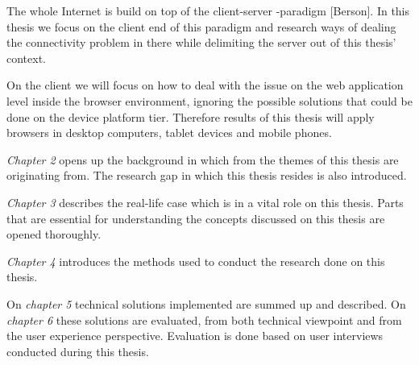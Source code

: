 The whole Internet is build on top of the client-server -paradigm [Berson]. In this thesis we focus on the client end of this paradigm and research ways of dealing the connectivity problem in there while delimiting the server out of this thesis' context. 

On the client we will focus on how to deal with the issue on the web application level inside the browser environment, ignoring the possible solutions that could be done on the device platform tier. Therefore results of this thesis will apply browsers in desktop computers, tablet devices and mobile phones.






\textit{Chapter 2} opens up the background in which from the themes of this thesis are originating from. The research gap in which this thesis resides is also introduced.

\textit{Chapter 3} describes the real-life case which is in a vital role on this thesis. Parts that are essential for understanding the concepts discussed on this thesis are opened thoroughly.

\textit{Chapter 4} introduces the methods used to conduct the research done on this thesis. 

On \textit{chapter 5} technical solutions implemented are summed up and described. On \textit{chapter 6} these solutions are evaluated, from both technical viewpoint and from the user experience perspective. Evaluation is done based on user interviews conducted during this thesis.















